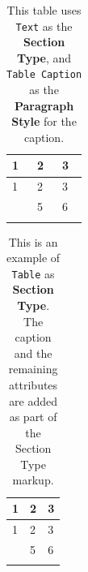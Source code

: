 \documentclass[
  12pt,
  a4paper,
  oneside,
  titlepage,
  toclink=all,
  toc=bibliography]{scrbook}
\theoremstyle{definition}
\theoremstyle{plain}
\theoremstyle{plain}
\theoremstyle{plain}
\theoremstyle{plain}
\theoremstyle{definition}
\theoremstyle{definition}
\theoremstyle{plain}
\theoremstyle{remark}
\begin{document}
\hypertarget{tbl-scriv31}{}
\begin{longtable}[]{@{}lll@{}}
\toprule\noalign{}
1 & 2 & 3 \\
\midrule\noalign{}
\endfirsthead
\toprule\noalign{}
1 & 2 & 3 \\
\midrule\noalign{}
\endhead
\bottomrule\noalign{}
\endlastfoot
4 & 5 & 6 \\
\caption{\label{tbl-scriv31}This table uses \texttt{Text} as the
\textbf{Section Type}, and \texttt{Table\ Caption} as the
\textbf{Paragraph Style} for the caption.}\tabularnewline
\end{longtable}

\hypertarget{tbl-scriv32}{}
\begin{longtable}[]{@{}lll@{}}
\toprule\noalign{}
1 & 2 & 3 \\
\midrule\noalign{}
\endfirsthead
\toprule\noalign{}
1 & 2 & 3 \\
\midrule\noalign{}
\endhead
\bottomrule\noalign{}
\endlastfoot
4 & 5 & 6 \\
\caption{\label{tbl-scriv32}This is an example of \texttt{Table} as
\textbf{Section Type}. The caption and the remaining attributes are
added as part of the Section Type markup.}\tabularnewline
\end{longtable}
\end{document}
